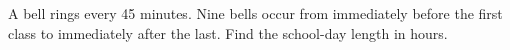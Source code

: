 A bell rings every 45 minutes. Nine bells occur from immediately before the first class to immediately after the last. Find the school-day length in hours.
